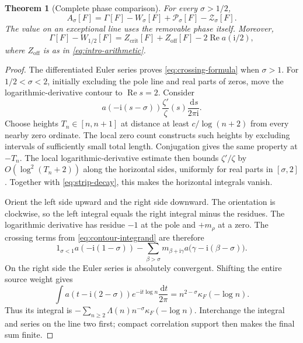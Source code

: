\documentclass[11pt]{article}
\numberwithin{equation}{section}
\newtheorem{theorem}{Theorem}[section]
\theoremstyle{definition}
\theoremstyle{remark}
\newcommand{\Rea}{\operatorname{Re}}
\newcommand{\ii}{\mathrm i}
\newcommand{\dd}{\,\mathrm d}
\newcommand{\Zcrit}{Z_{\mathrm{crit}}}
\newcommand{\Zoff}{Z_{\mathrm{off}}}
\begin{document}
\begin{theorem}[Complete phase comparison]\label{thm:crossings}
For every \(\sigma>1/2\),
\begin{equation}\label{eq:crossing-formula}
A_\sigma[F]=\Gamma[F]-W_\sigma[F]
+\mathcal P_\sigma[F]-\mathcal Z_\sigma[F].
\end{equation}
The value on an exceptional line uses the removable phase itself.
Moreover,
\begin{equation}\label{eq:critical-explicit}
\Gamma[F]-W_{1/2}[F]
=\Zcrit[F]+\Zoff[F]-2\Rea a(\ii/2),
\end{equation}
where \(\Zoff\) is as in \eqref{eq:intro-arithmetic}.
\end{theorem}
\begin{proof}
The differentiated Euler series proves
\eqref{eq:crossing-formula} when \(\sigma>1\).
For \(1/2<\sigma<2\), initially excluding the pole line and real
parts of zeros, move the logarithmic-derivative contour to
\(\Rea s=2\). Consider
\begin{equation}\label{eq:contour-integrand}
a(-\ii(s-\sigma))\frac{\zeta'}{\zeta}(s)\frac{\dd s}{2\pi\ii}.
\end{equation}
Choose heights \(T_n\in[n,n+1]\) at distance at least
\(c/\log(n+2)\) from every nearby zero ordinate. The local zero
count constructs such heights by excluding intervals of sufficiently
small total length. Conjugation gives the same property at \(-T_n\).
The local logarithmic-derivative estimate then bounds
\(\zeta'/\zeta\) by \(O(\log^2(T_n+2))\) along the horizontal
sides, uniformly for real parts in \([\sigma,2]\).
Together with \eqref{eq:strip-decay}, this makes the horizontal
integrals vanish.

Orient the left side upward and the right side downward. The
orientation is clockwise, so the left integral equals the right
integral minus the residues. The logarithmic derivative has residue
\(-1\) at the pole and \(+m_\rho\) at a zero. The crossing terms
from \eqref{eq:contour-integrand} are therefore
\[
1_{\sigma<1}a(-\ii(1-\sigma))
-\sum_{\beta>\sigma}m_{\beta+\ii\gamma}
a\bigl(\gamma-\ii(\beta-\sigma)\bigr).
\]
On the right side the Euler series is absolutely convergent.
Shifting the entire source weight gives
\[
\int a(t-\ii(2-\sigma))e^{-\ii t\log n}\frac{\dd t}{2\pi}
=n^{2-\sigma}\kappa_F(-\log n).
\]
Thus its integral is
\(-\sum_{n\ge2}\Lambda(n)n^{-\sigma}\kappa_F(-\log n)\).
Interchange the integral and series on the line two first;
compact correlation support then makes the final sum finite.


\end{proof}
\end{document}
